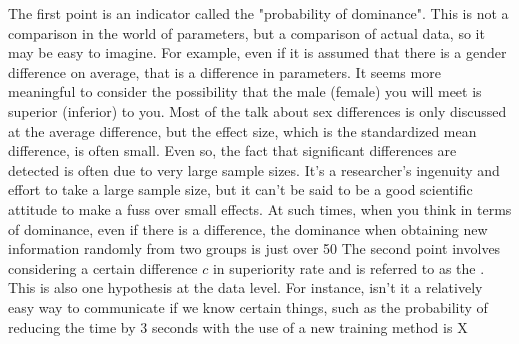 \documentclass{ltjsbook}
\begin{document}
The first point is an indicator called the "probability of dominance". This is not a comparison in the world of parameters, but a comparison of actual data, so it may be easy to imagine. For example, even if it is assumed that there is a gender difference on average, that is a difference in parameters. It seems more meaningful to consider the possibility that the male (female) you will meet is superior (inferior) to you. Most of the talk about sex differences is only discussed at the average difference, but the effect size, which is the standardized mean difference, is often small. Even so, the fact that significant differences are detected is often due to very large sample sizes. It's a researcher's ingenuity and effort to take a large sample size, but it can't be said to be a good scientific attitude to make a fuss over small effects. At such times, when you think in terms of dominance, even if there is a difference, the dominance when obtaining new information randomly from two groups is just over 50%
The second point involves considering a certain difference $c$ in superiority rate and is referred to as the  . This is also one hypothesis at the data level. For instance, isn't it a relatively easy way to communicate if we know certain things, such as the probability of reducing the time by 3 seconds with the use of a new training method is X%
\end{document}
